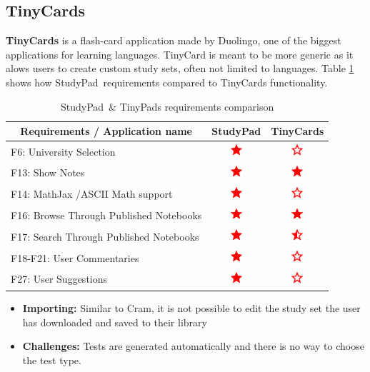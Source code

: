\documentclass[thesis=B,english]{FITthesis}[2012/10/20]
\newcommand{\appname}{StudyPad}
\newcommand{\present}{\begin{minipage}{.1\textwidth}
\centering
      \includegraphics[width=15pt, height=15pt]{ic_star_black_24dp}
    \end{minipage}}
\newcommand{\limited}{\begin{minipage}{.1\textwidth}
\centering
      \includegraphics[width=15pt, height=15pt]{ic_star_half_black_24dp}
    \end{minipage}}
\newcommand{\absent}{\begin{minipage}{.1\textwidth}
\centering
      \includegraphics[width=15pt, height=15pt]{ic_star_border_black_24dp}
    \end{minipage}}
\begin{document}
\subsection{TinyCards}

\textbf{TinyCards} is a flash-card application made by Duolingo, one of the biggest applications for learning languages. TinyCard is meant to be more generic as it alows users to create custom study sets, often not limited to languages. Table \ref{tab:tinycards} shows how \appname\ requirements compared to TinyCards functionality.

\begin{table}[H]
\caption{\appname\ \& TinyPads requirements comparison}
\label{tab:tinycards}
\begin{tabular}{|l|c|c|}
\hline
\multicolumn{1}{|c|}{\textbf{Requirements / Application name}} & \multicolumn{1}{l|}{\textbf{StudyPad}} & \multicolumn{1}{l|}{\textbf{TinyCards}} \\ \hline
F6: University Selection                                       & \present                                & \absent                                  \\ \hline
F13: Show Notes                                                & \present                                & \present                                 \\ \hline
F14: MathJax /ASCII Math support                               & \present                                & \absent                                  \\ \hline
F16: Browse Through Published Notebooks                        & \present                                & \present                                 \\ \hline
F17: Search Through Published Notebooks                    & \present                                & \limited                                 \\ \hline
F18-F21: User Commentaries                                     & \present                                & \absent                                  \\ \hline
F27: User Suggestions                                          & \present                                & \absent                                  \\ \hline
\end{tabular}
\end{table}


	\begin{itemize}
		\item \textbf{Importing:} Similar to Cram, it is not possible to edit the study set the user has downloaded and saved to their library
		\item \textbf{Challenges:} Tests are generated automatically and there is no way to choose the test type.
	\end{itemize}
	
\end{document}
